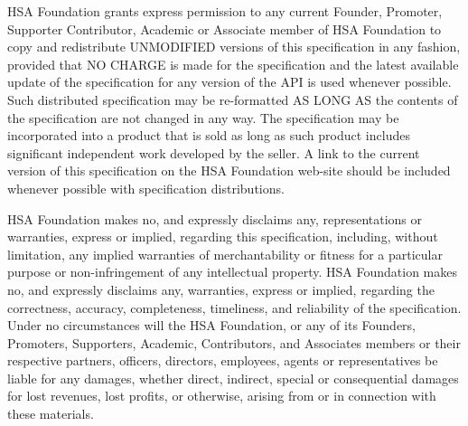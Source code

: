 \documentclass[final,oneside]{book}
\begin{document}
HSA Foundation grants express permission to any current Founder, Promoter,
Supporter Contributor, Academic or Associate member of HSA Foundation to copy
and redistribute UNMODIFIED versions of this specification in any fashion,
provided that NO CHARGE is made for the specification and the latest available
update of the specification for any version of the API is used whenever
possible. Such distributed specification may be re-formatted AS LONG AS the
contents of the specification are not changed in any way. The specification may
be incorporated into a product that is sold as long as such product includes
significant independent work developed by the seller. A link to the current
version of this specification on the HSA Foundation web-site should be included
whenever possible with specification distributions.

HSA Foundation makes no, and expressly disclaims any, representations or
warranties, express or implied, regarding this specification, including, without
limitation, any implied warranties of merchantability or fitness for a
particular purpose or non-infringement of any intellectual property. HSA
Foundation makes no, and expressly disclaims any, warranties, express or
implied, regarding the correctness, accuracy, completeness, timeliness, and
reliability of the specification. Under no circumstances will the HSA
Foundation, or any of its Founders, Promoters, Supporters, Academic,
Contributors, and Associates members or their respective partners, officers,
directors, employees, agents or representatives be liable for any damages,
whether direct, indirect, special or consequential damages for lost revenues,
lost profits, or otherwise, arising from or in connection with these materials.
\end{document}
